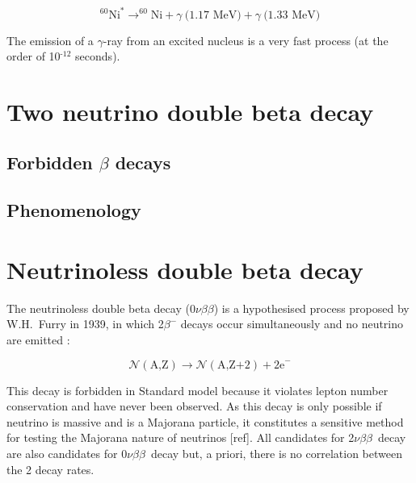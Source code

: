 \documentclass[main.tex]{subfiles}
\begin{document}
\begin{equation}
^{\text{60}}\text{Ni}^\ast \rightarrow ^{\text{60}}\text{Ni} + \gamma~\text{(1.17~MeV)} + \gamma~\text{(1.33~MeV)}
\end{equation}


\NI The emission of a $\gamma$-ray from an excited nucleus is a very fast process (at the order of 10$^{\text{-12}}$ seconds). 


\section{Two neutrino double beta decay}\label{sec:2nubb}


\subsection{Forbidden $\beta$ decays}





\subsection{Phenomenology}





\section{Neutrinoless double beta decay}\label{sec:0nubb}


\NI The neutrinoless double beta decay (0$\nu\beta\beta$) is a hypothesised process proposed by W.H.~Furry in 1939, in which 2$\beta^{-}$ decays occur simultaneously and no neutrino are emitted :


\begin{equation}
\mathcal{N} (\text{A,Z}) \rightarrow \mathcal{N} (\text{A,Z+2}) + \text{2e}^- 
\end{equation}


\bigskip


\NI This decay is forbidden in Standard model because it violates lepton number conservation and have never been observed. As this decay is only possible if neutrino is massive and is a Majorana particle, it constitutes a sensitive method for testing the Majorana nature of neutrinos [ref]. All candidates for 2$\nu\beta\beta$~decay are also candidates for 0$\nu\beta\beta$~decay but, a priori, there is no correlation between the 2 decay rates. 
\end{document}
